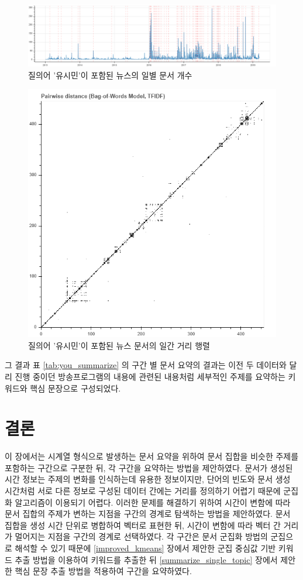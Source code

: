\documentclass[oneside, ko,phd]{snuthesis_utf8_kor}
\begin{document}
\begin{figure}[H]
\centering
\includegraphics[keepaspectratio=true, width=0.9\linewidth]{fig/timeseries_you_num_docs.png}
\caption{질의어 '유시민'이 포함된 뉴스의 일별 문서 개수}
\label{fig:timeseries_you_num_docs}
\end{figure}

\begin{figure}[H]
\centering
\includegraphics[keepaspectratio=true, width=0.5\linewidth]{fig/timeseries_you_pairwise.png}
\caption{질의어 '유시민'이 포함된 뉴스 문서의 일간 거리 행렬}
\label{fig:timeseries_you_pairwise}
\end{figure}

그 결과 표 \ref{tab:you_summarize} 의 구간 별 문서 요약의 결과는 이전 두 데이터와 달리 진행 중이던 방송프로그램의 내용에 관련된 내용처럼 세부적인 주제를 요약하는 키워드와 핵심 문장으로 구성되었다.


\section{결론}

이 장에서는 시계열 형식으로 발생하는 문서 요약을 위하여 문서 집합을 비슷한 주제를 포함하는 구간으로 구분한 뒤, 각 구간을 요약하는 방법을 제안하였다.
문서가 생성된 시간 정보는 주제의 변화를 인식하는데 유용한 정보이지만, 단어의 빈도와 문서 생성 시간처럼 서로 다른 정보로 구성된 데이터 간에는 거리를 정의하기 어렵기 때문에 군집화 알고리즘이 이용되기 어렵다.
이러한 문제를 해결하기 위하여 시간이 변함에 따라 문서 집합의 주제가 변하는 지점을 구간의 경계로 탐색하는 방법을 제안하였다.
문서 집합을 생성 시간 단위로 병합하여 벡터로 표현한 뒤, 시간이 변함에 따라 벡터 간 거리가 멀어지는 지점을 구간의 경계로 선택하였다.
각 구간은 문서 군집화 방법의 군집으로 해석할 수 있기 때문에 \ref{improved_kmeans} 장에서 제안한 군집 중심값 기반 키워드 추출 방법을 이용하여 키워드를 추출한 뒤 \ref{summarize_single_topic} 장에서 제안한 핵심 문장 추출 방법을 적용하여 구간을 요약하였다.
\end{document}
